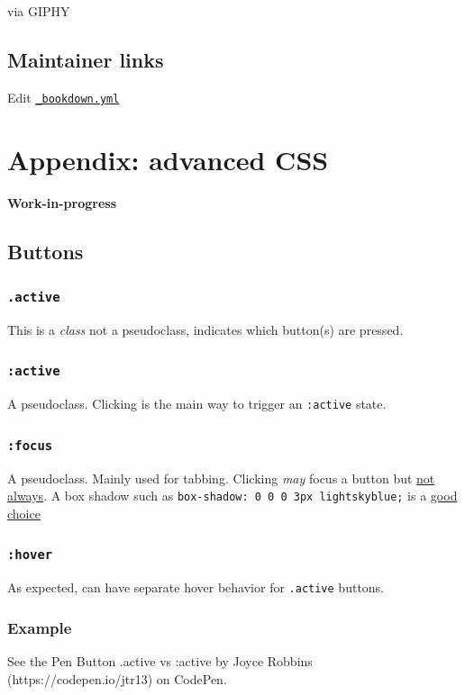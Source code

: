\documentclass[
  openany]{book}
\begin{document}
via GIPHY

\hypertarget{maintainer-links}{%
\section{Maintainer links}\label{maintainer-links}}

Edit \href{https://github.com/jtr13/d3book/edit/master/_bookdown.yml}{\texttt{\_bookdown.yml}}

\hypertarget{appendix-advanced-css}{%
\chapter{Appendix: advanced CSS}\label{appendix-advanced-css}}

\textbf{Work-in-progress}

\hypertarget{buttons}{%
\section{Buttons}\label{buttons}}

\hypertarget{active}{%
\subsection{\texorpdfstring{\texttt{.active}}{.active}}\label{active}}

This is a \emph{class} not a pseudoclass, indicates which button(s) are pressed.

\hypertarget{active-1}{%
\subsection{\texorpdfstring{\texttt{:active}}{:active}}\label{active-1}}

A pseudoclass. Clicking is the main way to trigger an \texttt{:active} state.

\hypertarget{focus}{%
\subsection{\texorpdfstring{\texttt{:focus}}{:focus}}\label{focus}}

A pseudoclass. Mainly used for tabbing. Clicking \emph{may} focus a button but \href{https://zellwk.com/blog/inconsistent-button-behavior/}{not always}. A box shadow such as \texttt{box-shadow:\ 0\ 0\ 0\ 3px\ lightskyblue;} is a \href{https://zellwk.com/blog/style-hover-focus-active-states/\#styling-focus-states}{good choice}

\hypertarget{hover}{%
\subsection{\texorpdfstring{\texttt{:hover}}{:hover}}\label{hover}}

As expected, can have separate hover behavior for \texttt{.active} buttons.

\hypertarget{example-2}{%
\subsection{Example}\label{example-2}}

{See the Pen
Button .active vs :active by Joyce Robbins (https://codepen.io/jtr13)
on CodePen.}

  
\end{document}
